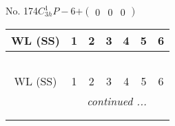 \documentclass[fleqn,9pt,landscape]{jsarticle}
\begin{document}
\newpage
No. 174\quad$C_{3h}^{1}$\quad$P-6$\quad[ hexagonal ]\quad$+\begin{pmatrix} 0 & 0 & 0 \end{pmatrix}$
\begin{center}
\renewcommand{\arraystretch}{1.2}
\begin{longtable}{ccccccc}
 \hline \hline
WL (SS) & 1 & 2 & 3 & 4 & 5 & 6 \\ \hline \endfirsthead

\multicolumn{6}{l}{\tablename\ \thetable{}} \\
 \hline \hline
WL (SS) & 1 & 2 & 3 & 4 & 5 & 6 \\ \hline \endhead

 \hline \hline
\multicolumn{6}{r}{\footnotesize\it continued ...} \\ \endfoot

 \hline \hline
\multicolumn{6}{r}{} \\ \endlastfoot


\end{longtable}
\end{center}
\end{document}
